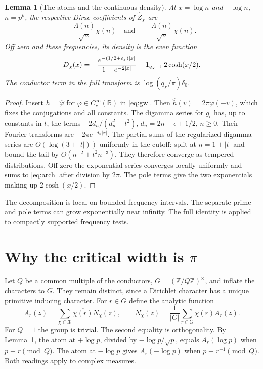 \documentclass[11pt]{article}
\newtheorem{lemma}[theorem]{Lemma}
\newcommand{\RR}{\mathbb R}
\newcommand{\cX}{\mathcal X}
\begin{document}
\begin{lemma}[The atoms and the continuous density]\label{lem:spec}
At \(x=\log n\) and \(-\log n\), \(n=p^k\), the respective Dirac coefficients of \(\widehat Z_\chi\) are
\[
 -\frac{\Lambda(n)}{\sqrt n}\overline{\chi(n)}
 \quad\text{and}\quad -\frac{\Lambda(n)}{\sqrt n}\chi(n).
\]
Off zero and these frequencies, its density is the even function
\begin{equation}\label{eq:arch}
 D_\chi(x)=-\frac{e^{-(1/2+\epsilon_\chi)|x|}}{1-e^{-2|x|}}
              +{\bf1}_{q_\chi=1}\,2\cosh(x/2).
\end{equation}
The conductor term in the full transform is \(\log(q_\chi/\pi)\delta_0\).
\end{lemma}
\begin{proof}
Insert \(h=\widehat\varphi\) for \(\varphi\in C_c^\infty(\RR)\) in \eqref{eq:gw}. Then \(\widehat h(v)=2\pi\varphi(-v)\), which fixes the conjugations and all constants. The digamma series for \(g_\epsilon\) has, up to constants in \(t\), the terms
\(-2d_n/(d_n^2+t^2)\), \(d_n=2n+\epsilon+1/2\), \(n\ge0\).
Their Fourier transforms are \(-2\pi e^{-d_n|x|}\). The partial sums of the regularized digamma series are \(O(\log(3+|t|))\) uniformly in the cutoff: split at \(n=1+|t|\) and bound the tail by \(O(n^{-2}+t^2n^{-3})\). They therefore converge as tempered distributions. Off zero the exponential series converges locally uniformly and sums to \eqref{eq:arch} after division by \(2\pi\). The pole terms give the two exponentials making up \(2\cosh(x/2)\).
\end{proof}
The decomposition is local on bounded frequency intervals. The separate prime and pole terms can grow exponentially near infinity. The full identity is applied to compactly supported frequency tests.

\section{Why the critical width is \texorpdfstring{\(\pi\)}{pi}}\label{sec:width}
Let \(Q\) be a common multiple of the conductors, \(G=(\mathbb Z/Q\mathbb Z)^\times\), and inflate the characters to \(G\). They remain distinct, since a Dirichlet character has a unique primitive inducing character. For \(r\in G\) define the analytic function
\begin{equation}\label{eq:row}
 A_r(z)=\sum_{\chi\in\cX}\overline{\chi(r)}N_\chi(z),\qquad
 N_\chi(z)=\frac1{|G|}\sum_{r\in G}\chi(r) A_r(z).
\end{equation}
For \(Q=1\) the group is trivial. The second equality is orthogonality.
By Lemma~\ref{lem:spec}, the atom at \(+\log p\), divided by \(-\log p/\sqrt p\), equals \(A_r(\log p)\) when \(p\equiv r\pmod Q\). The atom at \(-\log p\) gives \(A_r(-\log p)\) when \(p\equiv r^{-1}\pmod Q\). Both readings apply to complex measures.
\end{document}
